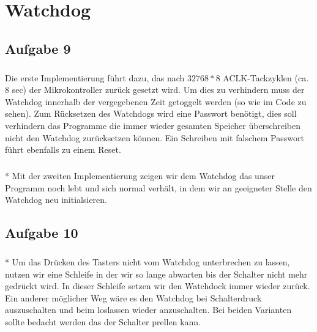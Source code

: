 \chapter{Watchdog}

\section{Aufgabe 9}

\paragraph*{}
Die erste Implementierung führt dazu, das nach $32768 * 8$ ACLK-Tackzyklen (ca. 8 sec) der Mikrokontroller zurück gesetzt wird. Um dies zu verhindern muss der Watchdog innerhalb der vergegebenen Zeit getoggelt werden (so wie im Code zu sehen). Zum Rücksetzen des Watchdogs wird eine Passwort benötigt, dies soll verhindern das Programme die immer wieder gesamten Speicher überschreiben nicht den Watchdog zurücksetzen können. Ein Schreiben mit falschem Passwort führt ebenfalls zu einem Reset. \\



\paragraph{}*
Mit der zweiten Implementierung zeigen wir dem Watchdog das unser Programm noch lebt und sich normal verhält, in dem wir an geeigneter Stelle den Watchdog neu initialsieren.

\section{Aufgabe 10}

\paragraph{}*
Um das Drücken des Tasters nicht vom Watchdog unterbrechen zu lassen, nutzen wir eine Schleife in der wir so lange abwarten bis der Schalter nicht mehr gedrückt wird. In dieser Schleife setzen wir den Watchdock immer wieder zurück. Ein anderer möglicher Weg wäre es den Watchdog bei Schalterdruck auszuschalten und beim loslassen wieder anzuschalten. Bei beiden Varianten sollte bedacht werden das der Schalter prellen kann. \\



